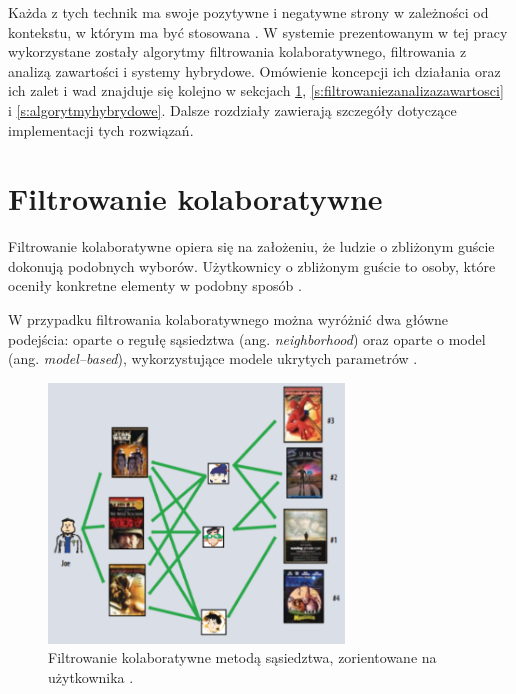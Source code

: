 \documentclass[twoside]{iisthesis}
\begin{document}
	 Każda z tych technik ma swoje pozytywne i negatywne strony w zależności od kontekstu, w którym ma być stosowana \cite{id:IntroductionToRecommenderSystemsHandbook}. W systemie prezentowanym w tej pracy wykorzystane zostały algorytmy filtrowania kolaboratywnego, filtrowania z analizą zawartości i systemy hybrydowe. Omówienie koncepcji ich działania oraz ich zalet i wad znajduje się kolejno w sekcjach \ref{s:filtrowaniekolaboratywne}, \ref{s:filtrowaniezanalizazawartosci} i \ref{s:algorytmyhybrydowe}. Dalsze rozdziały zawierają szczegóły dotyczące implementacji tych rozwiązań.
	 
	  \section{Filtrowanie kolaboratywne}
	  \label{s:filtrowaniekolaboratywne}
	  
	  Filtrowanie kolaboratywne opiera się na założeniu, że ludzie o zbliżonym guście dokonują podobnych wyborów. Użytkownicy o zbliżonym guście to osoby, które oceniły konkretne elementy w podobny sposób \cite{id:IntroductionToRecommenderSystemsHandbook, id:CollaborativeFilteringRecommenderSystems, id:huynh2012modeling}. 
	  
	  W przypadku filtrowania kolaboratywnego można wyróżnić dwa główne podejścia: oparte o regułę sąsiedztwa (ang. \textit{neighborhood}) oraz oparte o model (ang. \textit{model--based}), wykorzystujące modele ukrytych parametrów \cite{id:AdvancesInCollaborativeFiltering,koren2009matrix}. 
	  
	  \begin{figure}[!ht] 
	  	\centering
	  	\includegraphics[width=0.7\textwidth]{cf}
	  	\caption{Filtrowanie kolaboratywne metodą sąsiedztwa,  zorientowane na użytkownika \protect\cite{koren2009matrix}.}
	  	\label{fig:cf}
	  \end{figure}
	  
\end{document}

